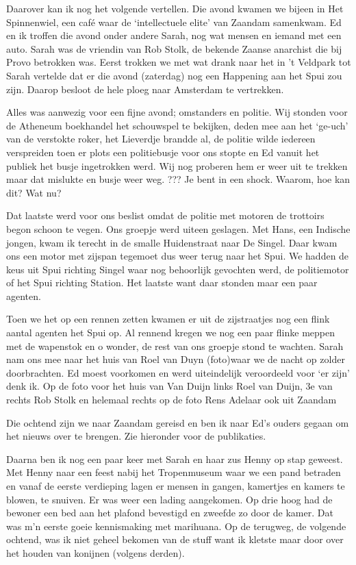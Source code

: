 \documentclass[10pt,twoside,openright]{memoir}
\begin{document}
Daarover kan ik nog het volgende vertellen. Die avond kwamen we bijeen in Het Spinnenwiel, een café waar de ‘intellectuele elite’ van Zaandam samenkwam. Ed en ik troffen die avond onder andere Sarah, nog wat mensen en iemand met een auto. Sarah was de vriendin van Rob Stolk, de bekende Zaanse anarchist die bij Provo betrokken was. Eerst trokken we met wat drank naar het in ’t Veldpark tot Sarah vertelde dat er die avond (zaterdag) nog een Happening aan het Spui zou zijn. Daarop besloot de hele ploeg naar Amsterdam te vertrekken. 

Alles was aanwezig voor een fijne avond; omstanders en politie. Wij stonden voor de Atheneum boekhandel het schouwspel te bekijken, deden mee aan het ‘ge-uch’ van de verstokte roker, het Lieverdje brandde al, de politie wilde iedereen verspreiden toen er plots een politiebusje voor ons stopte en Ed vanuit het publiek het busje ingetrokken werd. Wij nog proberen hem er weer uit te trekken maar dat mislukte en busje weer weg. ??? Je bent in een shock. Waarom, hoe kan dit? Wat nu? 

Dat laatste werd voor ons beslist omdat de politie met motoren de trottoirs begon schoon te vegen. Ons groepje werd uiteen geslagen. Met Hans, een Indische jongen, kwam ik terecht in de smalle Huidenstraat naar De Singel. Daar kwam ons een motor met zijspan tegemoet dus weer terug naar het Spui. We hadden de keus uit Spui richting Singel waar nog behoorlijk gevochten werd, de politiemotor of het Spui richting Station. Het laatste want daar stonden maar een paar agenten. 

Toen we het op een rennen zetten kwamen er uit de zijstraatjes nog een flink aantal agenten het Spui op. Al rennend kregen we nog een paar flinke meppen met de wapenstok en o wonder, de rest van ons groepje stond te wachten. Sarah nam ons mee naar het huis van Roel van Duyn (foto)waar we de nacht op zolder doorbrachten. Ed moest voorkomen en werd uiteindelijk veroordeeld voor ‘er zijn’ denk ik. Op de foto voor het huis van Van Duijn links Roel van Duijn, 3e van rechts Rob Stolk en helemaal rechts op de foto Rens Adelaar ook uit Zaandam

Die ochtend zijn we naar Zaandam gereisd en ben ik naar Ed’s ouders gegaan om het nieuws over te brengen. Zie hieronder voor de publikaties.

Daarna ben ik nog een paar keer met Sarah en haar zus Henny op stap geweest. Met Henny naar een feest nabij het Tropenmuseum waar we een pand betraden en vanaf de eerste verdieping lagen er mensen in gangen, kamertjes en kamers te blowen, te snuiven. Er was weer een lading aangekomen. Op drie hoog had de bewoner een bed aan het plafond bevestigd en zweefde zo door de kamer. Dat was m’n eerste goeie kennismaking met marihuana. Op de terugweg, de volgende ochtend, was ik niet geheel bekomen van de stuff want ik kletste maar door over het houden van konijnen (volgens derden).
\end{document}
